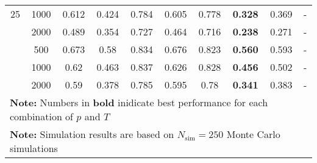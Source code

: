 \begin{landscape}
\begin{table}[p]
\begin{tabular}{cccccccccc}
	 25  & 1000 &       0.612        &           0.424           &            0.784            &           0.605           &            0.778            & \textbf{0.328}         &          0.369           & -                 \\ \hdashline
	 25  & 2000 &       0.489        &           0.354           &            0.727            &           0.464           &            0.716            & \textbf{0.238}         &          0.271           & -                 \\ \hdashline
	 36  & 500  &       0.673        &           0.58            &            0.834            &           0.676           &            0.823            & \textbf{0.560}         &          0.593           & -                 \\ \hdashline
	 36  & 1000 &        0.62        &           0.463           &            0.837            &           0.626           &            0.828            & \textbf{0.456}         &          0.502           & -                 \\ \hdashline
	 36  & 2000 &        0.59        &           0.378           &            0.785            &           0.595           &            0.78             & \textbf{0.341}         &          0.383           & -                 \\
	\hline
	\hline
    \multicolumn{10}{l}{\textbf{Note:} Numbers in \textbf{bold} inidicate best performance for each combination of $p$ and $T$} \\
    \multicolumn{10}{l}{\textbf{Note:} Simulation results are based on $N_\text{sim} = 250$ Monte Carlo simulations}
    \end{tabular}
    \end{table}
    \egroup
\end{landscape}
    